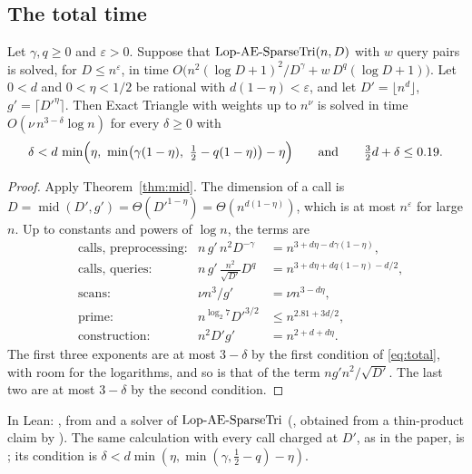 \subsection{The total time}

\begin{theorem}\label{thm:total}
Let \(\gamma,q\ge0\) and \(\varepsilon>0\).  Suppose that \(\textup{Lop-AE-SparseTri}(n,D)\) with
\(w\) query pairs is solved, for \(D\le n^{\varepsilon}\), in time
\(O\bigl(n^{2}(\log D+1)^{2}/D^{\gamma}+w\,D^{q}(\log D+1)\bigr)\).  Let
\(0<d\) and \(0<\eta<1/2\) be rational with \(d(1-\eta)<\varepsilon\), and let
\(D'=\lfloor n^{d}\rfloor\), \(g'=\lceil D'^{\eta}\rceil\).  Then Exact Triangle
with weights up to \(n^{\nu}\) is solved in time \(O(\nu\,n^{3-\delta}\log n)\)
for every \(\delta\ge0\) with
\begin{equation}\label{eq:total}
  \delta<d\,\min\Bigl(\eta,\ \min\bigl(\gamma(1-\eta),\ \tfrac12-q(1-\eta)\bigr)-\eta\Bigr)
  \qquad\text{and}\qquad \tfrac32d+\delta\le0.19 .
\end{equation}
\end{theorem}

\begin{proof}
Apply Theorem~\ref{thm:mid}.  The dimension of a call is
\(D=\operatorname{mid}(D',g')=\Theta(D'^{1-\eta})=\Theta(n^{d(1-\eta)})\), which
is at most \(n^{\varepsilon}\) for large \(n\).  Up to constants and powers of
\(\log n\), the terms are
\begin{align*}
  &\text{calls, preprocessing:} & n\,g'\,n^{2}D^{-\gamma}&=n^{3+d\eta-d\gamma(1-\eta)},\\
  &\text{calls, queries:} & n\,g'\,\frac{n^{2}}{\sqrt{D'}}D^{q}&=n^{3+d\eta+dq(1-\eta)-d/2},\\
  &\text{scans:} & \nu n^{3}/g'&=\nu n^{3-d\eta},\\
  &\text{prime:} & n^{\log_2 7}D'^{3/2}&\le n^{2.81+3d/2},\\
  &\text{construction:} & n^{2}D'g'&=n^{2+d+d\eta}.
\end{align*}
The first three exponents are at most \(3-\delta\) by the first condition of
\eqref{eq:total}, with room for the logarithms, and so is that of the term
\(ng'n^{2}/\sqrt{D'}\).  The last two are at most \(3-\delta\) by the second
condition.
\end{proof}

In Lean: , from  and a solver
of \(\textup{Lop-AE-SparseTri}\) (, obtained from a thin-product claim by
).  The same calculation with every call charged at
\(D'\), as in the paper, is ; its condition is
\(\delta<d\min(\eta,\min(\gamma,\frac12-q)-\eta)\).

